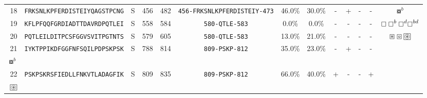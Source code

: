 \begin{tabular}{rcccccccccccc}
18 &  \texttt{FRKSNLKPFERDISTEIYQAGSTPCNG} &       S &    456 &   482 &  \texttt{{\scriptsize 456-}FRKSNLKPFERDISTEIY{\scriptsize -473}} &                          46.0\% &                           30.0\% &          - &           + &          - &           - &                                                                                                                               $ \boxcircle^b $ \\
19 &  \texttt{KFLPFQQFGRDIADTTDAVRDPQTLEI} &       S &    558 &   584 &                \texttt{{\scriptsize 580-}QTLE{\scriptsize -583}} &                           0.0\% &                            0.0\% &          - &           - &          - &           - &                                                                                           $ \boxempty \boxempty^b \boxempty^d \boxempty^{bd} $ \\
20 &  \texttt{PQTLEILDITPCSFGGVSVITPGTNTS} &       S &    579 &   605 &                \texttt{{\scriptsize 580-}QTLE{\scriptsize -583}} &                          13.0\% &                           21.0\% &          - &           - &          - &           - &                                                                         $ \boxast \boxcircle \setlength{\fboxsep}{0.5pt} \boxed{\circledast} $ \\
21 &  \texttt{IYKTPPIKDFGGFNFSQILPDPSKPSK} &       S &    788 &   814 &                \texttt{{\scriptsize 809-}PSKP{\scriptsize -812}} &                          35.0\% &                           23.0\% &          - &           + &          - &           - &                                                         \Centerstack{  $\boxempty \boxempty^b \boxempty^d \boxempty^{bd}$ \\  $\boxcircle^b$ } \\
22 &  \texttt{PSKPSKRSFIEDLLFNKVTLADAGFIK} &       S &    809 &   835 &                \texttt{{\scriptsize 809-}PSKP{\scriptsize -812}} &                          66.0\% &                           40.0\% &          + &           - &          - &           + &                             \Centerstack{  $\boxast \boxast^b \boxcircle \boxcircle^d$ \\  $\setlength{\fboxsep}{0.5pt} \boxed{\circledast}$ } \\
\bottomrule
\end{tabular}

